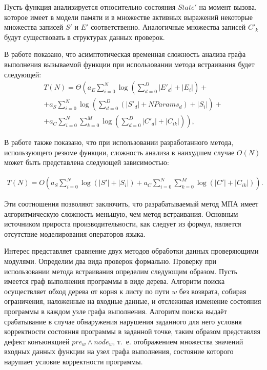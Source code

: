 Пусть функция анализируется относительно состояния $State'$ на момент вызова, которое имеет в модели памяти и в множестве активных выражений некоторые множества записей $S'$ и $E'$ соответственно. Аналогичные множества записей $C'_k$ будут существовать в структурах данных проверок.

В работе показано, что асимптотическая временная сложность анализа графа выполнения вызываемой функции при использовании метода встраивания будет следующей:
\begin{equation}
\label{eq:inlining-full}
\begin{split}
 T(N) = \Theta \left( a_E \sum_{i=0}^N \log \left(\sum_{d = 0}^D |E'_d| + |E_i| \right) + \right. \\
 + a_S \sum_{i=0}^N \log \left(\sum_{d = 0}^D \left(|S'_d| + NParams_d \right) + |S_i|\right)+ \\
 + \left.a_C \sum_{i=0}^N \sum_{k=0}^M  \log \left(\sum_{d = 0}^D |C'_d|  + |C_{ik}|  \right) \right),
 \end{split}
\end{equation}

В работе также показано, что при использовании разработанного метода, использующего резюме функции,  сложность анализа в наихудшем случае $O(N)$ может быть представлена следующей зависимостью:

\begin{equation}
\label{eq:summary-apply}
\begin{split}
 T(N) = O \left( a_S \sum_{i=0}^N \log \left(|S'| + |S_i|\right) +  a_C \sum_{i=0}^N \sum_{k=0}^M  \log \left(|C'|  + |C_{ik}|  \right) \right).
 \end{split}
\end{equation}

Эти соотношения позволяют заключить, что разрабатываемый метод МПА имеет алгоритмическую сложность меньшую, чем метод встраивания. Основным источником прироста производительности, как следует из формул, является отсутствие моделирования операторов языка.

Интерес представляет сравнение двух методов обработки данных проверяющими модулями. Определим два вида проверок формально. Проверку при использовании метода встраивания определим следующим образом. Пусть имеется граф выполнения программы в виде дерева. Алгоритм поиска осуществляет обход дерева от корня к листу по пути $w$ без возврата, собирая ограничения, наложенные на входные данные, и отслеживая изменение состояния программы в каждом узле графа выполнения. Алгоритм поиска выдаёт срабатывание в случае обнаружения нарушения заданного для него условия корректности состояния программы в заданной точке, таким образом представляя дефект конъюнкцией $pre_w \wedge node_w$, т.~е. отображением множества значений входных данных функции на узел графа выполнения, состояние которого нарушает условие корректности программы.

